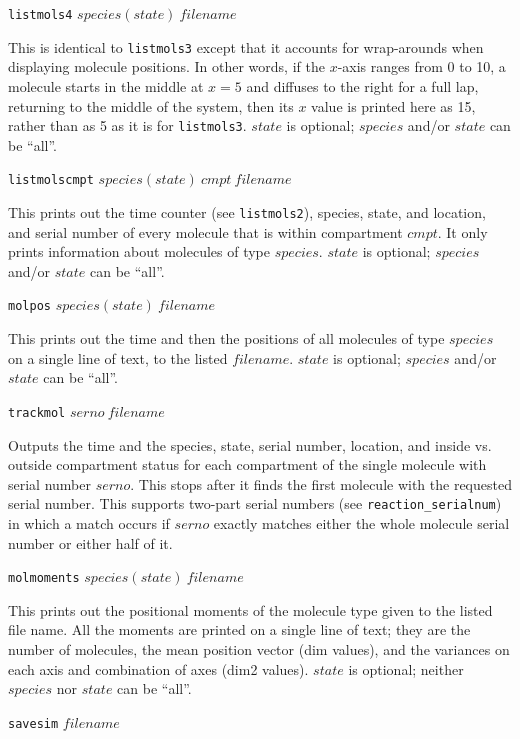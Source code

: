 \documentclass {scrbook}
\newcommand {\ttt} {\texttt}
\begin{document}
\begin{description}
\item{\ttt{listmols4} $species(state)\ filename$}

This is identical to \ttt{listmols3} except that it accounts for wrap-arounds when displaying molecule positions. In other words, if the $x$-axis ranges from 0 to 10, a molecule starts in the middle at $x = 5$ and diffuses to the right for a full lap, returning to the middle of the system, then its $x$ value is printed here as 15, rather than as 5 as it is for \ttt{listmols3}. $state$ is optional; $species$ and/or $state$ can be ``all''.

\item{\ttt{listmolscmpt} $species(state)\ cmpt\ filename$}

This prints out the time counter (see \ttt{listmols2}), species, state, and location, and serial number of every molecule that is within compartment $cmpt$. It only prints information about molecules of type $species$. $state$ is optional; $species$ and/or $state$ can be ``all''.

\item{\ttt{molpos} $species(state)\ filename$}

This prints out the time and then the positions of all molecules of type $species$ on a single line of text, to the listed $filename$. $state$ is optional; $species$ and/or $state$ can be ``all''.

\item{\ttt{trackmol} $serno\ filename$}

Outputs the time and the species, state, serial number, location, and inside vs. outside compartment status for each compartment of the single molecule with serial number $serno$. This stops after it finds the first molecule with the requested serial number. This supports two-part serial numbers (see \ttt{reaction\_serialnum}) in which a match occurs if $serno$ exactly matches either the whole molecule serial number or either half of it.

\item{\ttt{molmoments} $species(state)\ filename$}

This prints out the positional moments of the molecule type given to the listed file name. All the moments are printed on a single line of text; they are the number of molecules, the mean position vector (dim values), and the variances on each axis and combination of axes (dim2 values). $state$ is optional; neither $species$ nor $state$ can be ``all''.

\item{\ttt{savesim} $filename$}


\end{description}
\end{document}
